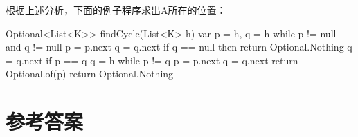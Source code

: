 \documentclass[b5paper]{ctexart}
\begin{document}
\begin{Answer}[ref = {ex:list-others}]
{根据上述分析，下面的例子程序求出A所在的位置：

\begin{Bourbaki}
Optional<List<K>> findCycle(List<K> h) {
    var p = h, q = h
    while p != null and q != null {
        p = p.next
        q = q.next
        if q == null then return Optional.Nothing
        q = q.next
        if p == q {
            q = h
            while p != q {
                p = p.next
                q = q.next
            }
            return Optional.of(p)
        }
    }
    return Optional.Nothing
}
\end{Bourbaki}
}
\end{Answer}

\ifx\wholebook\relax \else
\section{参考答案}
\shipoutAnswer
\end{document}
